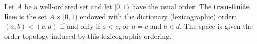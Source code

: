 Let $A$ be a well-ordered set and let $[0,1)$ have the usual order. The \textbf{transfinite line} is the set $A \times [0,1)$ endowed with the dictionary (lexicographic) order: $(a,b) < (c,d)$ if and only if $a < c$, or $a = c$ and $b < d$. The space is given the order topology induced by this lexicographic ordering.
